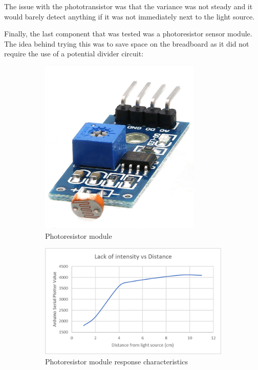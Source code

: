 The issue with the phototransistor was that the variance was not steady and it would barely detect anything if it was not immediately next to the light source.

Finally, the last component that was tested was a photoresistor sensor module. The idea behind trying this was to save space on the breadboard as it did not require the use of a potential divider circuit:

\begin{figure}
    \centering
    \begin{subfigure}[b]{0.2\linewidth}
        \includegraphics[width=\linewidth]{images/photomodule.png}
        \caption{Photoresistor module}
    \end{subfigure}
    \hspace{2cm}
    \begin{subfigure}[b]{0.4\linewidth}
        \includegraphics[width=\linewidth]{images/photomodule-graph.png}
        \caption{Photoresistor module response characteristics}
    \end{subfigure}
    \caption{}
\end{figure}

